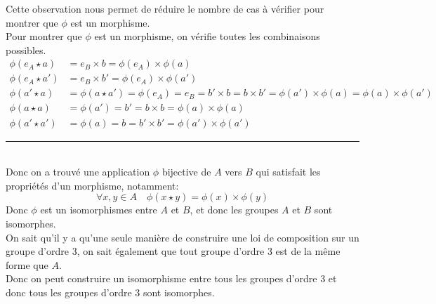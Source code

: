\documentclass[11pt, a4paper, twoside]{article}
\newcommand\hr{
    \noindent\rule[0.5ex]{\linewidth}{0.5pt}
}
\begin{document}
Cette observation nous permet de réduire le nombre de cas à vérifier pour montrer que $\phi$ est un morphisme.\\
Pour montrer que $\phi$ est un morphisme, on vérifie toutes les combinaisons possibles.
\begin{align*}
	\phi( e_A \star a) &= e_B \times b = \phi( e_A) \times \phi( a) \\
	\phi( e_A \star a') &= e_B \times b' = \phi( e_A)  \times \phi( a')\\
	\phi( a' \star a) &= \phi(a \star a') = \phi( e_A)  =  e_B = b' \times b = b \times b'=\phi( a') \times \phi( a) = \phi( a) \times \phi( a') \\
	\phi(a \star a) &= \phi( a') = b' = b \times b = \phi( a) \times \phi( a)\\
	\phi( a' \star a') &= \phi( a) = b = b' \times b' = \phi( a') \times \phi( a') 
\end{align*}
\hr\\
Donc on a trouvé une application $\phi$ bijective de $A$ vers $B$ qui satisfait les propriétés d'un morphisme, notamment:
\[ 
	\forall x,y \in A \quad \phi( x \star y) = \phi( x) \times \phi( y) 
\]
Donc $\phi$ est un isomorphismes entre $A$ et $B$, et donc les groupes $A$ et $B$ sont isomorphes.\\

On sait qu'il y a qu'une seule manière de construire une loi de composition sur un groupe d'ordre 3, on sait également que tout groupe d'ordre 3 est de la même forme que $A$.\\
Donc on peut construire un isomorphisme entre tous les groupes d'ordre 3 et donc tous les groupes d'ordre 3 sont isomorphes.
\end{document}
